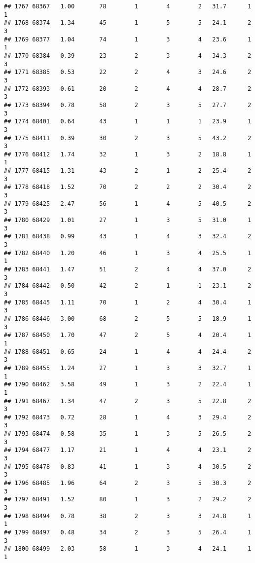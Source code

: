 \documentclass[
]{article}
\begin{document}
\begin{verbatim}
## 1767 68367   1.00       78        1        4        2   31.7      1      1
## 1768 68374   1.34       45        1        5        5   24.1      2      3
## 1769 68377   1.04       74        1        3        4   23.6      1      1
## 1770 68384   0.39       23        2        3        4   34.3      2      3
## 1771 68385   0.53       22        2        4        3   24.6      2      3
## 1772 68393   0.61       20        2        4        4   28.7      2      3
## 1773 68394   0.78       58        2        3        5   27.7      2      3
## 1774 68401   0.64       43        1        1        1   23.9      1      3
## 1775 68411   0.39       30        2        3        5   43.2      2      3
## 1776 68412   1.74       32        1        3        2   18.8      1      1
## 1777 68415   1.31       43        2        1        2   25.4      2      3
## 1778 68418   1.52       70        2        2        2   30.4      2      3
## 1779 68425   2.47       56        1        4        5   40.5      2      3
## 1780 68429   1.01       27        1        3        5   31.0      1      3
## 1781 68438   0.99       43        1        4        3   32.4      2      3
## 1782 68440   1.20       46        1        3        4   25.5      1      1
## 1783 68441   1.47       51        2        4        4   37.0      2      3
## 1784 68442   0.50       42        2        1        1   23.1      2      3
## 1785 68445   1.11       70        1        2        4   30.4      1      3
## 1786 68446   3.00       68        2        5        5   18.9      1      3
## 1787 68450   1.70       47        2        5        4   20.4      1      1
## 1788 68451   0.65       24        1        4        4   24.4      2      3
## 1789 68455   1.24       27        1        3        3   32.7      1      1
## 1790 68462   3.58       49        1        3        2   22.4      1      1
## 1791 68467   1.34       47        2        3        5   22.8      2      3
## 1792 68473   0.72       28        1        4        3   29.4      2      3
## 1793 68474   0.58       35        1        3        5   26.5      2      3
## 1794 68477   1.17       21        1        4        4   23.1      2      3
## 1795 68478   0.83       41        1        3        4   30.5      2      3
## 1796 68485   1.96       64        2        3        5   30.3      2      3
## 1797 68491   1.52       80        1        3        2   29.2      2      3
## 1798 68494   0.78       38        2        3        3   24.8      1      1
## 1799 68497   0.48       34        2        3        5   26.4      1      3
## 1800 68499   2.03       58        1        3        4   24.1      1      1

\end{verbatim}
\end{document}
